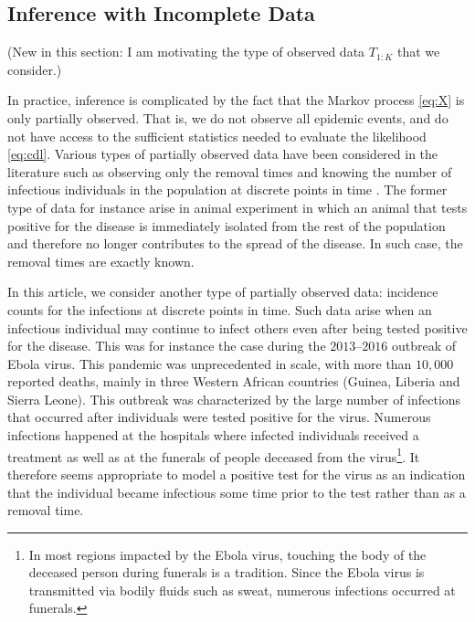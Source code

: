 \documentclass[11pt]{article}
\begin{document}
	\subsection{Inference with Incomplete Data}
	\label{sec:iid}
	
	(New in this section: I am motivating the type of observed data  $T_{1:K}$ that we consider.)
	
	In practice, inference is complicated by the fact that the Markov process \ref{eq:X} is only partially observed. That is, we do not observe all epidemic events, and do not have access to the sufficient statistics needed to evaluate the likelihood \ref{eq:cdl}. Various types of partially observed data have been considered in the literature such as observing only the removal times \cite{Gibson.1998, ONeill.1999} and knowing the number of infectious individuals in the population at discrete points in time \cite{Fintzi.2017}. The former type of data for instance arise in animal experiment in which an animal that tests positive for the disease is immediately isolated from the rest of the population and therefore no longer contributes to the spread of the disease. In such case, the removal times are exactly known.
	
	In this article, we consider another type of partially observed data: incidence counts for the infections at discrete points in time. Such data arise when an infectious individual may continue to infect others even after being tested positive for the disease. This was for instance the case during the $2013$–$2016$ outbreak of Ebola virus. This pandemic was unprecedented in scale, with more than $10,000$ reported deaths, mainly in three Western African countries (Guinea, Liberia and Sierra Leone). This outbreak was characterized by the large number of infections that occurred after individuals were tested positive for the virus. Numerous infections happened at the hospitals where infected individuals received a treatment as well as at the funerals of people deceased from the virus\footnote{In most regions impacted by the Ebola virus, touching the body of the deceased person during funerals is a tradition. Since the Ebola virus is transmitted via bodily fluids such as sweat, numerous infections occurred at funerals.}. 
	It therefore seems appropriate to model a positive test for the virus as an indication that the individual became infectious some time prior to the test rather than as a removal time.
		
\end{document}
